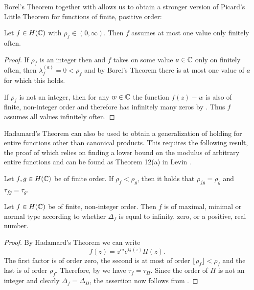 Borel's Theorem together with  allows us to obtain a stronger version of Picard's Little Theorem for functions of finite, positive order:

\begin{corollary}
    Let $f \in H(\mathbb{C})$ with $\rho_f \in (0, \infty)$. Then $f$ assumes at most one value only finitely often.
\end{corollary}

\begin{proof}
    If $\rho_f$ is an integer then and $f$ takes on some value $a \in \mathbb{C}$ only on finitely often, then $\lambda_f^{(a)} = 0 < \rho_f$ and by Borel's Theorem there is at most one value of $a$ for which this holds.

    If $\rho_f$ is not an integer, then for any $w \in \mathbb{C}$ the function $f(z) - w$ is also of finite, non-integer order and therefore has infinitely many zeros by . Thus $f$ assumes all values infinitely often.
\end{proof}

Hadamard's Theorem can also be used to obtain a generalization of  holding for entire functions other than canonical products. This requires the following result, the proof of which relies on finding a lower bound on the modulus of arbitrary entire functions and can be found as Theorem 12(a) in Levin \cite{levin-distribution-of-zeros}.

\begin{proposition} \label{prop:order-type-product-equality}
    Let $f, g \in H(\mathbb{C})$ be of finite order. If $\rho_f < \rho_g$, then it holds that $ \rho_{fg} = \rho_g $ and $\tau_{fg} = \tau_g$.
\end{proposition}

\begin{theorem} \label{thm:entire-function-type-density}
    Let $f \in H(\mathbb{C})$ be of finite, non-integer order. Then $f$ is of maximal, minimal or normal type according to whether $\Delta_f$ is equal to infinity, zero, or a positive, real number.
\end{theorem}

\begin{proof}
    By Hadamard's Theorem we can write
    $$ f(z) = z^m e^{Q(z)} \Pi(z). $$
    The first factor is of order zero, the second is at most of order $\lfloor \rho_f \rfloor < \rho_f$ and the last is of order $\rho_f$. Therefore, by  we have  $\tau_f = \tau_\Pi$. Since the order of $\Pi$ is not an integer and clearly $\Delta_f = \Delta_\Pi$, the assertion now follows from .
\end{proof}